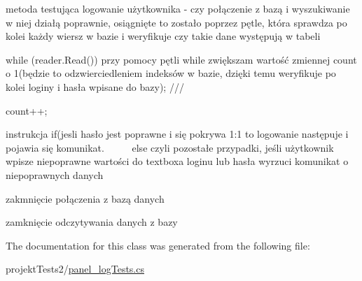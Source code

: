metoda testująca logowanie użytkownika -\/ czy połączenie z bazą i wyszukiwanie w niej działą poprawnie, osiągnięte to zostało poprzez pętle, która sprawdza po kolei każdy wiersz w bazie i weryfikuje czy takie dane występują w tabeli 

while (reader.\+Read()) przy pomocy pętli while zwiększam wartość zmiennej count o 1(będzie to odzwierciedleniem indeksów w bazie, dzięki temu weryfikuje po kolei loginy i hasła wpisane do bazy); ///

count++;

instrukcja if(jesli hasło jest poprawne i się pokrywa 1\+:1 to logowanie następuje i pojawia się komunikat. ~\newline
~\newline
~\newline
 else czyli pozostałe przypadki, jeśli użytkownik wpisze niepoprawne wartości do textboxa loginu lub hasła wyrzuci komunikat o niepoprawnych danych

zakmnięcie połączenia z bazą danych

zamknięcie odczytywania danych z bazy 

The documentation for this class was generated from the following file\+:\begin{DoxyCompactItemize}
\item 
projekt\+Tests2/\mbox{\hyperlink{panel__log_tests_8cs}{panel\+\_\+log\+Tests.\+cs}}\end{DoxyCompactItemize}
